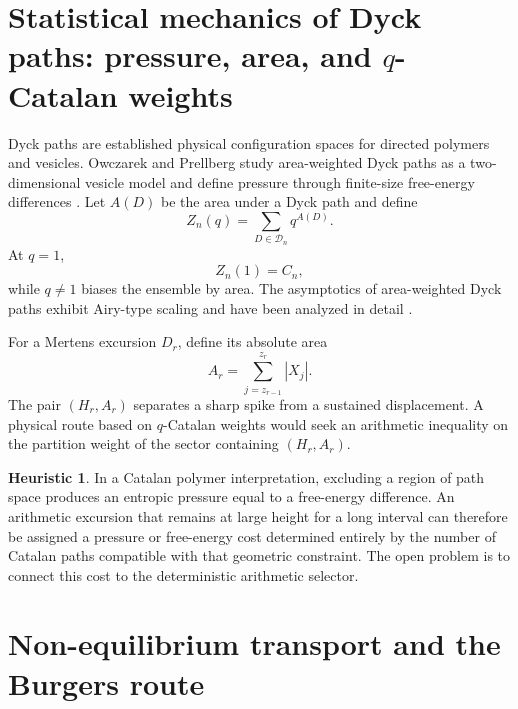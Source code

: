 \documentclass[11pt]{amsart}
\numberwithin{equation}{section}
\theoremstyle{plain}
\theoremstyle{definition}
\newtheorem{heuristic}[theorem]{Heuristic}
\theoremstyle{remark}
\newcommand{\Cat}{C}
\newcommand{\D}{\mathcal{D}}
\begin{document}
\section{Statistical mechanics of Dyck paths: pressure, area, and $q$-Catalan weights}
\label{sec:dyck_statistical_mechanics}

Dyck paths are established physical configuration spaces for directed polymers and vesicles.  Owczarek and Prellberg study area-weighted Dyck paths as a two-dimensional vesicle model and define pressure through finite-size free-energy differences \cite{OwczarekPrellberg2014}.  Let $A(D)$ be the area under a Dyck path and define
\begin{equation}
Z_n(q)
=
\sum_{D\in\D_n} q^{A(D)}.
\label{eq:q_catalan_partition}
\end{equation}
At $q=1$,
\begin{equation}
Z_n(1)=\Cat_n,
\label{eq:q_catalan_at_one}
\end{equation}
while $q\ne1$ biases the ensemble by area.  The asymptotics of area-weighted Dyck paths exhibit Airy-type scaling and have been analyzed in detail \cite{HaugPrellberg2015}.

For a Mertens excursion $D_r$, define its absolute area
\begin{equation}
A_r
=
\sum_{j=z_{r-1}}^{z_r}|X_j|.
\label{eq:mertens_excursion_area}
\end{equation}
The pair $(H_r,A_r)$ separates a sharp spike from a sustained displacement.  A physical route based on $q$-Catalan weights would seek an arithmetic inequality on the partition weight of the sector containing $(H_r,A_r)$.

\begin{heuristic}
\label{heur:entropic_pressure}
In a Catalan polymer interpretation, excluding a region of path space produces an entropic pressure equal to a free-energy difference.  An arithmetic excursion that remains at large height for a long interval can therefore be assigned a pressure or free-energy cost determined entirely by the number of Catalan paths compatible with that geometric constraint.  The open problem is to connect this cost to the deterministic arithmetic selector.
\end{heuristic}

\section{Non-equilibrium transport and the Burgers route}
\label{sec:tasep_burgers}
\end{document}
